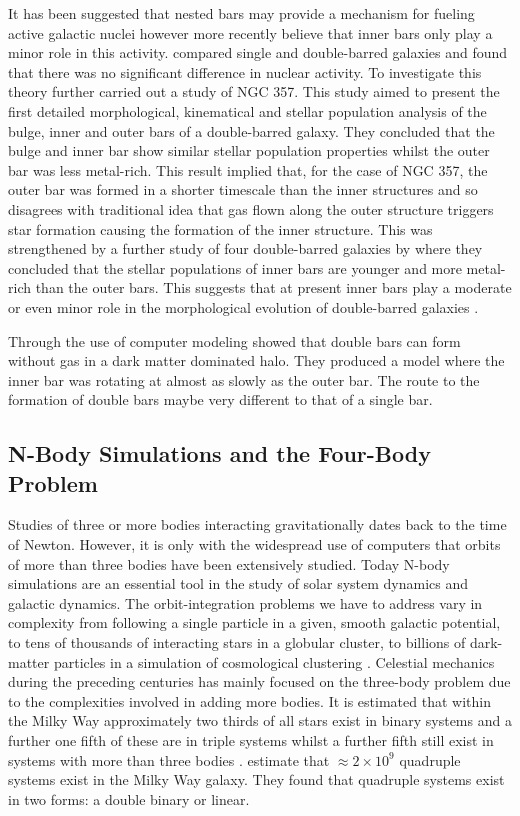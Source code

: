 \documentclass[a4paper,12pt]{article}
\begin{document}
It has been suggested that nested bars may provide a mechanism for fueling active galactic nuclei \citep{shlosman} however more recently \citep{erwin3} believe that inner bars only play a minor role in this 
activity. \citep{erwin1} compared single and double-barred galaxies and found that there was no significant difference in nuclear activity. To investigate this theory further \cite{lorenzo1} carried out a 
study of NGC 357. This study aimed to present the first detailed morphological, kinematical and stellar population analysis of the bulge, inner and outer bars of a double-barred galaxy. They concluded that
the bulge and inner bar show similar stellar population properties whilst the outer bar was less metal-rich. This result implied that, for the case of NGC 357, the outer bar was formed in a shorter timescale than
the inner structures and so disagrees with traditional idea that gas flown along the outer structure triggers star formation causing the formation of the inner structure. This was strengthened by a further study of
four double-barred galaxies by \cite{lorenzo2} where they concluded that the stellar populations of inner bars are younger and more metal-rich than the outer bars. This suggests that at present inner bars play a
moderate or even minor role in the morphological evolution of double-barred galaxies \citep{lorenzo2}.

Through the use of computer modeling \cite{saha} showed that double bars can form without gas in a dark matter dominated halo. They produced a model where the inner bar was rotating at almost as slowly as the 
outer bar. The route to the formation of double bars maybe very different to that of a single bar.

\subsection{N-Body Simulations and the Four-Body Problem}
Studies of three or more bodies interacting gravitationally dates back to the time of Newton. However, it is only with the widespread use of computers that orbits of more than three bodies have been extensively studied. Today
N-body simulations are an essential tool in the study of solar system dynamics and galactic dynamics. The orbit-integration problems we have to address
vary in complexity from following a single particle in a given, smooth galactic potential, to tens of thousands of interacting stars in a globular cluster, to billions of dark-matter particles in a 
simulation of cosmological clustering \citep{binney}. Celestial mechanics during the preceding centuries has mainly focused on the three-body problem
due to the complexities involved in adding more bodies. It is estimated that within the Milky Way approximately two thirds of all stars exist in binary systems and a further one fifth of these are in triple systems whilst a
further fifth still exist in systems with more than three bodies \citep{steves}. \cite{steves} estimate that $\approx2\times10^9$ quadruple systems exist in the Milky Way galaxy. They found that quadruple systems exist in two
forms: a double binary or linear.
\end{document}

